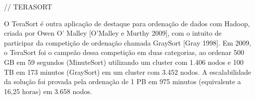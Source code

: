 %
%
%
%





// TERASORT


O TeraSort é outra aplicação de destaque para ordenação de dados com Hadoop, criada por Owen O' Malley [O'Malley e Murthy 2009], com o intuito de participar da competição de ordenação chamada GraySort [Gray 1998]. Em 2009, o TeraSort foi o campeão dessa competição em duas categorias, ao ordenar 500 GB em 59 segundos (MinuteSort) utilizando um cluster com 1.406 nodos e 100 TB em 173 minutos (GraySort) em um cluster com 3.452 nodos. A escalabilidade da solução foi provada pela ordenação de 1 PB em 975 minutos (equivalente a 16,25 horas) em 3.658 nodos.


